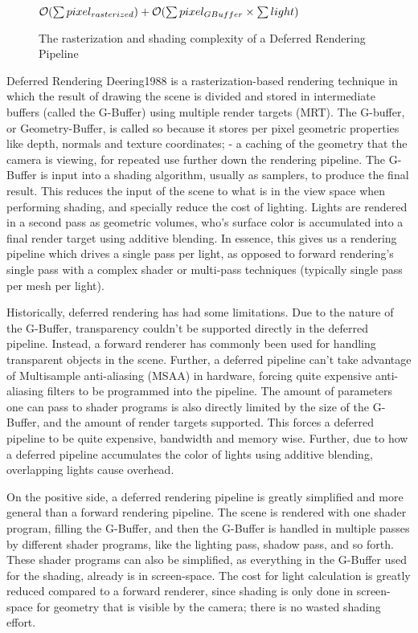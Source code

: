\begin{figure}[H]
	\begin{math}
		\mathcal{O}(\sum {pixel_{rasterized}}) + \mathcal{O}(\sum {pixel_{GBuffer}} \times \sum {light})
	\end{math}
	\caption{The rasterization and shading complexity of a Deferred Rendering Pipeline}
	\label{fig:DRP_complexity}
\end{figure}

Deferred Rendering Deering1988 is a rasterization-based rendering technique in which the result of drawing the scene is divided and stored in intermediate buffers (called the G-Buffer) using multiple render targets (MRT).  The G-buffer, or Geometry-Buffer, is called so because it stores per pixel geometric properties like depth, normals and texture coordinates; - a caching of the geometry that the camera is viewing, for repeated use further down the rendering pipeline. The G-Buffer is input into a shading algorithm, usually as samplers, to produce the final result. This reduces the input of the scene to what is in the view space when performing shading, and specially reduce the cost of lighting. Lights are rendered in a second pass as geometric volumes, who's surface color is accumulated into a final render target using additive blending. In essence, this gives us a rendering pipeline which drives a single pass per light, as opposed to forward rendering's single pass with a complex shader or multi-pass techniques (typically single pass per mesh per light).

Historically, deferred rendering has had some limitations. Due to the nature of the G-Buffer, transparency couldn't be supported directly in the deferred pipeline. Instead, a forward renderer has commonly been used for handling transparent objects in the scene. Further, a deferred pipeline can't take advantage of Multisample anti-aliasing (MSAA) in hardware, forcing quite expensive anti-aliasing filters to be programmed into the pipeline. The amount of parameters one can pass to shader programs is also directly limited by the size of the G-Buffer, and the amount of render targets supported. This forces a deferred pipeline to be quite expensive, bandwidth and memory wise. Further, due to how a deferred pipeline accumulates the color of lights using additive blending, overlapping lights cause overhead.

On the positive side, a deferred rendering pipeline is greatly simplified and more general than a forward rendering pipeline. The scene is rendered with one shader program, filling the G-Buffer, and then the G-Buffer is handled in multiple passes by different shader programs, like the lighting pass, shadow pass, and so forth. These shader programs can also be simplified, as everything in the G-Buffer used for the shading, already is in screen-space. The cost for light calculation is greatly reduced compared to a forward renderer, since shading is only done in screen-space for geometry that is visible by the camera; there is no wasted shading effort.

